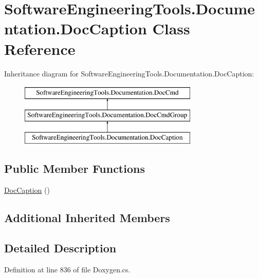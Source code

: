 \hypertarget{class_software_engineering_tools_1_1_documentation_1_1_doc_caption}{\section{Software\+Engineering\+Tools.\+Documentation.\+Doc\+Caption Class Reference}
\label{class_software_engineering_tools_1_1_documentation_1_1_doc_caption}
}
Inheritance diagram for Software\+Engineering\+Tools.\+Documentation.\+Doc\+Caption\+:\begin{figure}[H]
\begin{center}
\leavevmode
\includegraphics[height=3.000000cm]{class_software_engineering_tools_1_1_documentation_1_1_doc_caption}
\end{center}
\end{figure}
\subsection*{Public Member Functions}
\begin{DoxyCompactItemize}
\item 
\hyperlink{class_software_engineering_tools_1_1_documentation_1_1_doc_caption_a023a86d07d2247e1136007aad4e0c523}{Doc\+Caption} ()
\end{DoxyCompactItemize}
\subsection*{Additional Inherited Members}


\subsection{Detailed Description}


Definition at line 836 of file Doxygen.\+cs.



